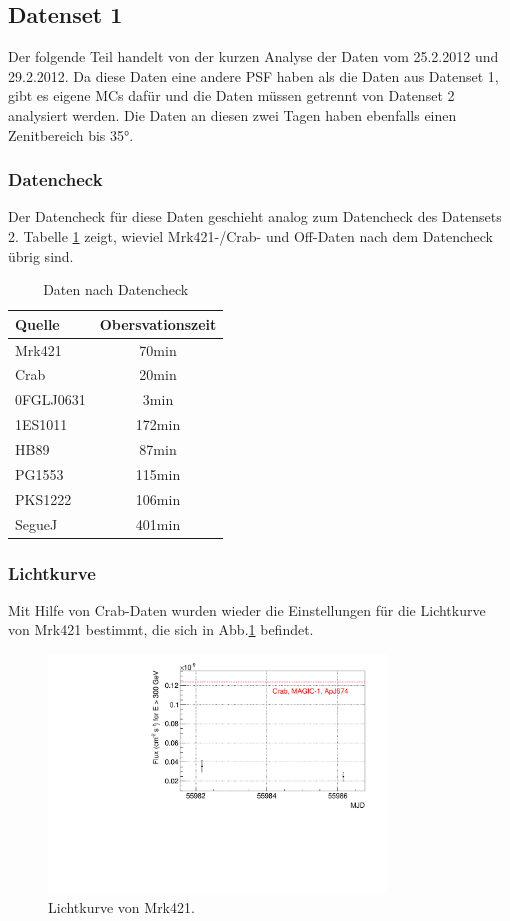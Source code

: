 \subsection{Datenset 1}
\label{subsec:Datenset_1}
Der folgende Teil handelt von der kurzen Analyse der Daten vom 25.2.2012 und 29.2.2012.
Da diese Daten eine andere PSF haben als die Daten aus Datenset 1, gibt es eigene MCs dafür und die Daten müssen getrennt von Datenset 2 analysiert werden.
Die Daten an diesen zwei Tagen haben ebenfalls einen Zenitbereich bis 35°.

\subsubsection{Datencheck}
Der Datencheck für diese Daten geschieht analog zum Datencheck des Datensets 2. 
Tabelle \ref{tab:Datenset1} zeigt, wieviel Mrk421-/Crab- und Off-Daten nach dem Datencheck übrig sind.

\begin{table}[!h]
\centering
\caption{Daten nach Datencheck}
\label{tab:Datenset1}
\begin{tabular}{lc}
  \toprule
  Quelle & Obersvationszeit\\
  \midrule
  \midrule
  Mrk421 & 70min\\
  \midrule
  Crab & 20min\\
  \midrule
  0FGLJ0631 & 3min \\
  1ES1011 & 172min \\
  HB89 & 87min \\
  PG1553 & 115min \\
  PKS1222 & 106min \\
  SegueJ & 401min \\
  \bottomrule
  \bottomrule
\end{tabular}
\end{table}

\subsubsection{Lichtkurve}
Mit Hilfe von Crab-Daten wurden wieder die Einstellungen für die Lichtkurve von Mrk421 bestimmt, die sich in Abb.\ref{Datenset1_LC_Mrk421} befindet.

\begin{figure}
    \centering
    \includegraphics[width=0.8\textwidth]{./Plots/04_MrkAnalyse/Datenset1/Datenset1_LC_Mrk421.pdf}
    \caption{Lichtkurve von Mrk421.}
    \label{Datenset1_LC_Mrk421}
\end{figure}

